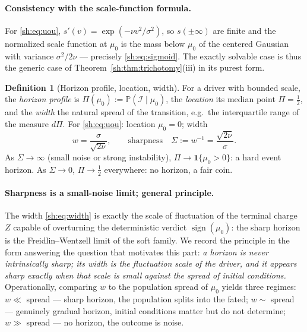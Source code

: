 \documentclass[11pt]{article}
\numberwithin{equation}{section}
\theoremstyle{plain}
\theoremstyle{definition}
\newtheorem{definition}[theorem]{Definition}
\theoremstyle{remark}
\newcommand{\PP}{\mathbb{P}}
\newcommand{\one}{\mathbf{1}}
\newcommand{\Imm}{\mathcal{I}}
\begin{document}
\paragraph{Consistency with the scale-function formula.}\label{sh:rem:crosscheck}
For \eqref{sh:eq:uou}, $s'(v)=\exp(-\nu v^2/\sigma^2)$, so
$s(\pm\infty)$ are finite and the normalized scale function at $\mu_0$ is
the mass below $\mu_0$ of the centered Gaussian with variance
$\sigma^2/2\nu$ --- precisely \eqref{sh:eq:sigmoid}. The exactly solvable
case is thus the generic case of
Theorem~\ref{sh:thm:trichotomy}(iii) in its purest form.

\begin{definition}[Horizon profile, location, width]\label{sh:def:width}
For a driver with bounded scale, the \emph{horizon profile} is
$\Pi(\mu_0):=\PP(\Imm\mid\mu_0)$, the \emph{location} its median point
$\Pi=\tfrac12$, and the \emph{width} the natural spread of the transition,
e.g.\ the interquartile range of the measure $d\Pi$. For
\eqref{sh:eq:uou}: location $\mu_0=0$; width
\begin{equation}\label{sh:eq:width}
w=\frac{\sigma}{\sqrt{2\nu}},\qquad\text{sharpness}\quad
\Sigma:=w^{-1}=\frac{\sqrt{2\nu}}{\sigma}.
\end{equation}
As $\Sigma\to\infty$ (small noise or strong instability),
$\Pi\to\one\{\mu_0>0\}$: a hard event horizon. As $\Sigma\to0$,
$\Pi\to\tfrac12$ everywhere: no horizon, a fair coin.
\end{definition}

\paragraph{Sharpness is a small-noise limit; general principle.}\label{sh:rem:FW}
The width \eqref{sh:eq:width} is exactly the scale of fluctuation of the
terminal charge $Z$ capable of overturning the deterministic verdict
$\operatorname{sign}(\mu_0)$: the sharp horizon is the Freidlin--Wentzell
limit \cite{FW12} of the soft family. We record the principle in the form
answering the question that motivates this part: \emph{a horizon is
never intrinsically sharp; its width is the fluctuation scale of the
driver, and it appears sharp exactly when that scale is small against the
spread of initial conditions.} Operationally, comparing $w$ to the
population spread of $\mu_0$ yields three regimes: $w\ll$ spread --- sharp
horizon, the population splits into the fated; $w\sim$ spread --- genuinely
gradual horizon, initial conditions matter but do not determine;
$w\gg$ spread --- no horizon, the outcome is noise.
\end{document}
